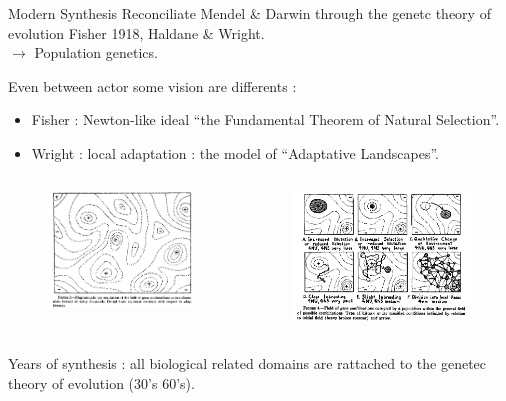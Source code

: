 \documentclass[8pt]{beamer}
\begin{document}
\begin{frame}{Modern Synthesis}
	Reconciliate Mendel \& Darwin through the genetc theory of evolution Fisher 1918, Haldane \& Wright.\\

	$\rightarrow$ Population genetics.
	\vfill 

	Even between actor some vision are differents :
	\begin{itemize}
		\item Fisher : Newton-like ideal  ``the Fundamental Theorem of Natural Selection''.
		\item Wright : local adaptation : the model of ``Adaptative Landscapes''.
	\end{itemize}

	\begin{columns}
		\begin{figure}[hbp]
			\begin{center}
				\includegraphics[width=4cm]{images/wrightFL.png}
			\end{center}
		\end{figure}
		\begin{figure}[hbp]
			\begin{center}
				\includegraphics[width=5cm]{images/wrightFL2.png}
			\end{center}
		\end{figure}
	\end{columns}

	\vfill
	Years of synthesis : all biological related domains are rattached to the genetec theory of evolution (30's 60's).

\end{frame}
\end{document}
